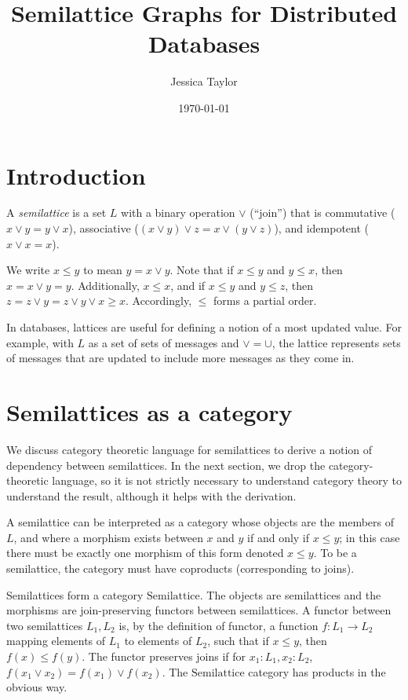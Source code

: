 \documentclass{article}
\title{Semilattice Graphs for Distributed Databases}
\author{Jessica Taylor}
\date{\today}
\begin{document}
    \maketitle
    
    \section{Introduction}
        A \emph{semilattice} is a set $L$ with a binary operation $\vee$ (``join'') that is commutative ($x \vee y = y \vee x$), associative ($(x \vee y) \vee z = x \vee (y \vee z)$), and idempotent ($x \vee x = x$).

        We write $x \leq y$ to mean $y = x \vee y$. Note that if $x \leq y$ and $y \leq x$, then $x = x \vee y = y$. Additionally, $x \leq x$, and if $x \leq y$ and $y \leq z$, then $z = z \vee y = z \vee y \vee x \geq x$. Accordingly, $\leq$ forms a partial order.

        In databases, lattices are useful for defining a notion of a most updated value. For example, with $L$ as a set of sets of messages and $\vee = \cup$, the lattice represents sets of messages that are updated to include more messages as they come in.

    \section{Semilattices as a category}

      We discuss category theoretic language for semilattices to derive a notion of dependency between semilattices. In the next section, we drop the category-theoretic language, so it is not strictly necessary to understand category theory to understand the result, although it helps with the derivation.

      A semilattice can be interpreted as a category whose objects are the members of $L$, and where a morphism exists between $x$ and $y$ if and only if $x \leq y$; in this case there must be exactly one morphism of this form denoted $x \leq y$. To be a semilattice, the category must have coproducts (corresponding to joins).

      Semilattices form a category $\mathrm{Semilattice}$.  The objects are semilattices and the morphisms are join-preserving functors between semilattices. A functor between two semilattices $L_1, L_2$ is, by the definition of functor, a function $f: L_1 \rightarrow L_2$ mapping elements of $L_1$ to elements of $L_2$, such that if $x \leq y$, then $f(x) \leq f(y)$. The functor preserves joins if for $x_1 : L_1, x_2 : L_2$, $f(x_1 \vee x_2) = f(x_1) \vee f(x_2)$. The $\mathrm{Semilattice}$ category has products in the obvious way.
\end{document}
